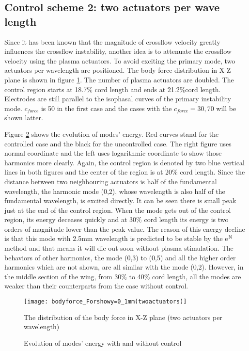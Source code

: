 \documentclass{AIAA}
\begin{document}
\subsection{Control scheme 2: two actuators per wave length}\label{subs:control2}
Since it has been known that the magnitude of crossflow velocity greatly influences the crossflow instability, another idea is to attenuate the crossflow velocity using the plasma actuators. To avoid exciting the primary mode, two actuators per wavelength are positioned. The body force distribution in X-Z plane is shown in figure \ref{f:force2perwavelength}. The number of plasma actuators are doubled. The control region starts at 18.7\% cord length and ends at 21.2\%cord length. Electrodes are still parallel to the isophasal curves of the primary instability mode. $c_{force}$ is 50 in the first case and the cases with the $c_{force}=30,70$ will be shown latter.

Figure \ref{f:basecase} shows the evolution of modes' energy. Red curves stand for the controlled case and the black for the uncontrolled case. The right figure uses normal coordinate and the left uses logarithmic coordinate to show those harmonics more clearly. Again, the control region is denoted by two blue vertical lines in both figures and the center of the region is at 20\% cord length. Since the distance between two neighbouring actuators is half of the fundamental wavelength, the harmonic mode (0,2), whose wavelength is also half of the fundamental wavelength, is excited directly. It can be seen there is small peak just at the end of the control region. When the mode gets out of the control region, its energy deceases quickly and at 30\% cord length its energy is two orders of magnitude lower than the peak value. The reason of this energy decline is that this mode with 2.5mm wavelength is predicted to be stable by the e$^{\rm N}$ method and that means it will die out soon without plasma stimulation. The behaviors of other harmonics, the mode (0,3) to (0,5) and all the higher order harmonics which are not shown, are all similar with the mode (0,2). However, in the middle section of the wing, from 30\% to 40\% cord length, all the modes are weaker than their counterparts from the case without control.
\begin{figure}
\centering
  \texttt{[image: bodyforce\_Forshowy=0\_1mm(twoactuators)]}
  \caption{The distribution of the body force in X-Z plane (two actuators per wavelength)}%
  \label{f:force2perwavelength}
\end{figure}
\begin{figure}
\centering
  \caption{Evolution of modes' energy with and without control}%
  \label{f:basecase}
\end{figure}
\end{document}
